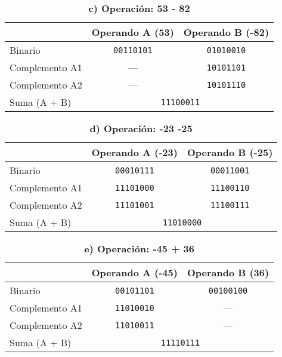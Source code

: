 \documentclass[a4paper,12pt]{article}
\begin{document}
	\begin{table}[H]
		\centering
		\caption*{\textbf{c) Operación: 53 - 82}}
		\begin{tabular}{|l|c|c|}
			\hline
			\textbf{}       & \textbf{Operando A (53)} & \textbf{Operando B (-82)} \\
			\hline
			Binario         & \texttt{00110101}        & \texttt{01010010} \\
			Complemento A1  & ---                      & \texttt{10101101} \\
			Complemento A2  & ---                      & \texttt{10101110} \\
			\hline
			Suma (A + B)    & \multicolumn{2}{c|}{\texttt{11100011}} \\
			\hline
		\end{tabular}
	\end{table}
	
	\begin{table}[H]
		\centering
		\caption*{\textbf{d) Operación: -23 -25}}
		\begin{tabular}{|l|c|c|}
			\hline
			\textbf{}       & \textbf{Operando A (-23)} & \textbf{Operando B (-25)} \\
			\hline
			Binario         & \texttt{00010111}        & \texttt{00011001} \\
			Complemento A1  & \texttt{11101000}        & \texttt{11100110} \\
			Complemento A2  & \texttt{11101001}        & \texttt{11100111} \\
			\hline
			Suma (A + B)    & \multicolumn{2}{c|}{\texttt{11010000}} \\
			\hline
		\end{tabular}
	\end{table}
	
	\begin{table}[H]
		\centering
		\caption*{\textbf{e) Operación: -45 + 36}}
		\begin{tabular}{|l|c|c|}
			\hline
			\textbf{}       & \textbf{Operando A (-45)} & \textbf{Operando B (36)} \\
			\hline
			Binario         & \texttt{00101101}        & \texttt{00100100} \\
			Complemento A1  & \texttt{11010010}        & ---               \\
			Complemento A2  & \texttt{11010011}        & ---               \\
			\hline
			Suma (A + B)    & \multicolumn{2}{c|}{\texttt{11110111}} \\
			\hline
		\end{tabular}
	\end{table}
	
\end{document}

